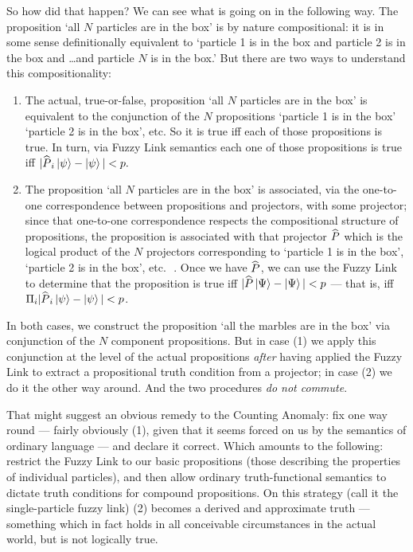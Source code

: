 \documentclass[12pt]{article}
\newcommand{\etc}{etc.\,\ }
\newcommand{\ket}[1]{\ensuremath{\left|  #1 \right\rangle}}
\newcommand{\op}[1]{\ensuremath{\widehat{\textsf{\ensuremath{#1}}}}}
\begin{document}
So how did that happen? We can see what is going on in the following way. The proposition `all $N$ particles are in the box' is by nature compositional: it is in some sense definitionally equivalent to `particle 1 is in the box and particle 2 is in the box and \ldots and particle $N$ is in the box.' But there are two ways to understand this compositionality:
\begin{enumerate} 
\item The actual, true-or-false, proposition `all $N$ particles are in the box' is equivalent to the conjunction of the $N$ propositions `particle 1 is in the box' `particle 2 is in the box', etc. So it is true iff each of those propositions is true. In turn, via Fuzzy Link semantics each one of those propositions is true iff $|\op{P}_i\ket{\psi}-\ket{\psi}|<p.$
\item The proposition `all $N$ particles are in the box' is associated, via the one-to-one correspondence between propositions and projectors, with some projector; since that one-to-one correspondence respects the compositional structure of propositions, the proposition is associated with that projector \op{P} which is the logical product of the $N$ projectors corresponding to `particle 1 is in the box', `particle 2 is in the box', \etc. Once we have \op{P}, we can use the Fuzzy Link to determine that the proposition is true iff $|\op{P}\ket{\Psi}-\ket{\Psi}|<p$ --- that is, iff $\Pi_i|\op{P}_i\ket{\psi}-\ket{\psi}|<p$.
\end{enumerate}
In both cases, we construct the proposition `all the marbles are in the box' via conjunction of the $N$ component propositions. But in case (1) we apply this conjunction at the level of the actual propositions \emph{after} having applied the Fuzzy Link to extract a propositional truth condition from a projector; in case (2) we do it the other way around. And the two procedures \emph{do not commute}.


That might suggest an obvious remedy to the Counting Anomaly: fix one way round --- fairly obviously (1), given that it seems forced on us by the semantics of ordinary language --- and declare it correct. Which amounts to the following: restrict the Fuzzy Link to our basic propositions (those describing the properties of individual particles), and then allow ordinary truth-functional semantics to dictate truth conditions for compound propositions. On this strategy (call it the single-particle fuzzy link) (2) becomes a derived and approximate truth --- something which in fact holds in all conceivable circumstances in the actual world, but is not logically true.
\end{document}
